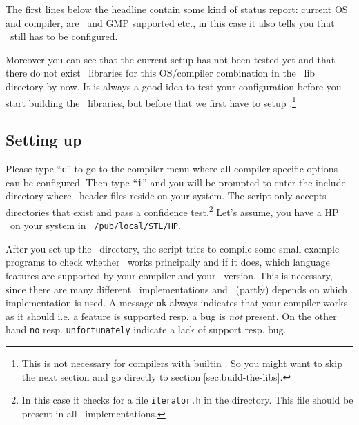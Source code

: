 The first lines below the headline contain some kind of status report:
current OS and compiler, are \leda\ and GMP supported etc., in this
case it also tells you that \stl\ still has to be configured.

Moreover you can see that the current setup has not been tested yet
and that there do not exist \cgal\ libraries for this OS/compiler
combination in the \cgal\ lib directory by now. It is always a good
idea to test your configuration before you start building the \cgal\ 
libraries, but before that we first have to setup \stl.\footnote{This
  is not necessary for compilers with builtin \stl. So you might want
  to skip the next section and go directly to section
  \ref{sec:build-the-libs}.}

\subsection{Setting up \stl}\label{sec:set-up-stl}

Please type ``\texttt{c}'' to go to the compiler menu where all
compiler specific options can be configured. Then type ``\texttt{i}''
and you will be prompted to enter the include directory where \stl\ 
header files reside on your system. The script only accepts
directories that exist and pass a confidence test.\footnote{In this
  case it checks for a file \texttt{iterator.h} in the directory.
  This file should be present in all \stl\ implementations.} Let's
assume, you have a \textsc{HP} \stl\ on your system in {\tt
  /pub/local/STL/HP}.

After you set up the \stl\ directory, the script tries to compile some
small example programs to check whether \stl\ works principally and if
it does, which language features are supported by your compiler and
your \stl\ version. This is necessary, since there are many different
\stl\ implementations and \cgal\ (partly) depends on which
implementation is used. A message \texttt{ok} always indicates that
your compiler works as it should i.e. a feature is supported resp. a
bug is \textit{not} present. On the other hand \texttt{no} resp.
\texttt{unfortunately} indicate a lack of support resp. bug.


